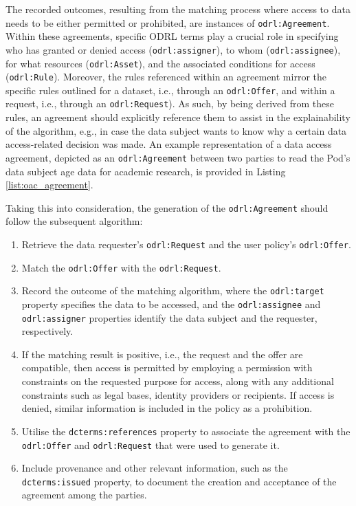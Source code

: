 The recorded outcomes, resulting from the matching process where access to data needs to be either permitted or prohibited, are instances of \texttt{odrl:Agreement}.
Within these agreements, specific ODRL terms play a crucial role in specifying who has granted or denied access (\texttt{odrl:assigner}), to whom (\texttt{odrl:assignee}), for what resources (\texttt{odrl:Asset}), and the associated conditions for access (\texttt{odrl:Rule}).
Moreover, the rules referenced within an agreement mirror the specific rules outlined for a dataset, i.e., through an \texttt{odrl:Offer}, and within a request, i.e., through an \texttt{odrl:Request}).
As such, by being derived from these rules, an agreement should explicitly reference them to assist in the explainability of the algorithm, e.g., in case the data subject wants to know why a certain data access-related decision was made.
An example representation of a data access agreement, depicted as an \texttt{odrl:Agreement} between two parties to read the Pod's data subject age data for academic research, is provided in Listing \ref{list:oac_agreement}.

Taking this into consideration, the generation of the \texttt{odrl:Agreement} should follow the subsequent algorithm:
\begin{enumerate}
    \item Retrieve the data requester's \texttt{odrl:Request} and the user policy's \texttt{odrl:Offer}.
    \item Match the \texttt{odrl:Offer} with the \texttt{odrl:Request}.
    \item Record the outcome of the matching algorithm, where the \texttt{odrl:target} property specifies the data to be accessed, and the \texttt{odrl:assignee} and \texttt{odrl:assigner} properties identify the data subject and the requester, respectively.
    \item If the matching result is positive, i.e., the request and the offer are compatible, then access is permitted by employing a permission with constraints on the requested purpose for access, along with any additional constraints such as legal bases, identity providers or recipients. If access is denied, similar information is included in the policy as a prohibition.
    \item Utilise the \texttt{dcterms:references} property to associate the agreement with the \texttt{odrl:Offer} and \texttt{odrl:Request} that were used to generate it.
    \item Include provenance and other relevant information, such as the \texttt{dcterms:issued} property, to document the creation and acceptance of the agreement among the parties.
\end{enumerate}

